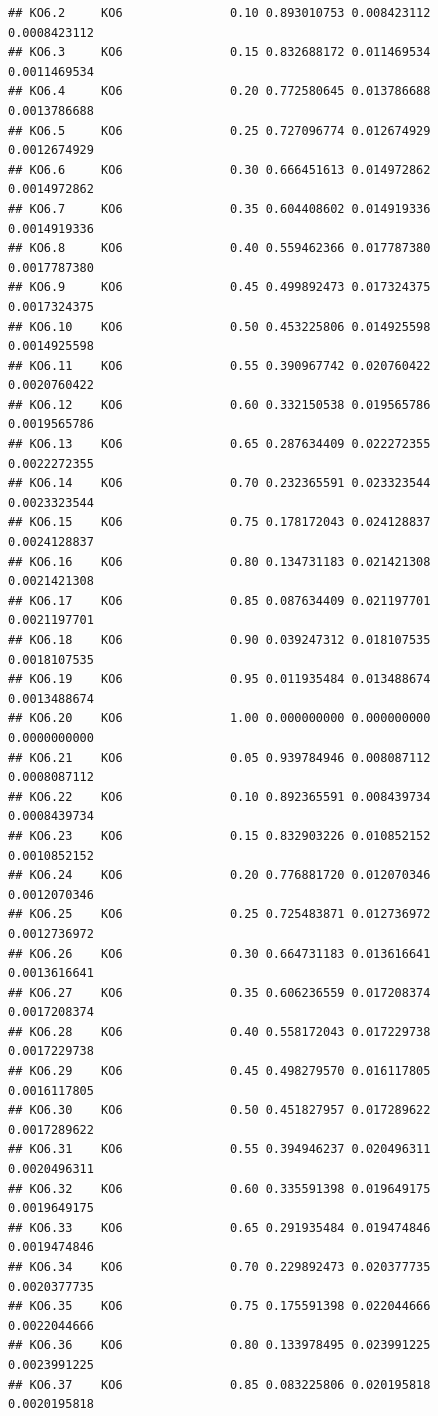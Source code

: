 \documentclass[
]{book}
\begin{document}
\begin{verbatim}
## KO6.2     KO6               0.10 0.893010753 0.008423112 0.0008423112
## KO6.3     KO6               0.15 0.832688172 0.011469534 0.0011469534
## KO6.4     KO6               0.20 0.772580645 0.013786688 0.0013786688
## KO6.5     KO6               0.25 0.727096774 0.012674929 0.0012674929
## KO6.6     KO6               0.30 0.666451613 0.014972862 0.0014972862
## KO6.7     KO6               0.35 0.604408602 0.014919336 0.0014919336
## KO6.8     KO6               0.40 0.559462366 0.017787380 0.0017787380
## KO6.9     KO6               0.45 0.499892473 0.017324375 0.0017324375
## KO6.10    KO6               0.50 0.453225806 0.014925598 0.0014925598
## KO6.11    KO6               0.55 0.390967742 0.020760422 0.0020760422
## KO6.12    KO6               0.60 0.332150538 0.019565786 0.0019565786
## KO6.13    KO6               0.65 0.287634409 0.022272355 0.0022272355
## KO6.14    KO6               0.70 0.232365591 0.023323544 0.0023323544
## KO6.15    KO6               0.75 0.178172043 0.024128837 0.0024128837
## KO6.16    KO6               0.80 0.134731183 0.021421308 0.0021421308
## KO6.17    KO6               0.85 0.087634409 0.021197701 0.0021197701
## KO6.18    KO6               0.90 0.039247312 0.018107535 0.0018107535
## KO6.19    KO6               0.95 0.011935484 0.013488674 0.0013488674
## KO6.20    KO6               1.00 0.000000000 0.000000000 0.0000000000
## KO6.21    KO6               0.05 0.939784946 0.008087112 0.0008087112
## KO6.22    KO6               0.10 0.892365591 0.008439734 0.0008439734
## KO6.23    KO6               0.15 0.832903226 0.010852152 0.0010852152
## KO6.24    KO6               0.20 0.776881720 0.012070346 0.0012070346
## KO6.25    KO6               0.25 0.725483871 0.012736972 0.0012736972
## KO6.26    KO6               0.30 0.664731183 0.013616641 0.0013616641
## KO6.27    KO6               0.35 0.606236559 0.017208374 0.0017208374
## KO6.28    KO6               0.40 0.558172043 0.017229738 0.0017229738
## KO6.29    KO6               0.45 0.498279570 0.016117805 0.0016117805
## KO6.30    KO6               0.50 0.451827957 0.017289622 0.0017289622
## KO6.31    KO6               0.55 0.394946237 0.020496311 0.0020496311
## KO6.32    KO6               0.60 0.335591398 0.019649175 0.0019649175
## KO6.33    KO6               0.65 0.291935484 0.019474846 0.0019474846
## KO6.34    KO6               0.70 0.229892473 0.020377735 0.0020377735
## KO6.35    KO6               0.75 0.175591398 0.022044666 0.0022044666
## KO6.36    KO6               0.80 0.133978495 0.023991225 0.0023991225
## KO6.37    KO6               0.85 0.083225806 0.020195818 0.0020195818

\end{verbatim}
\end{document}
